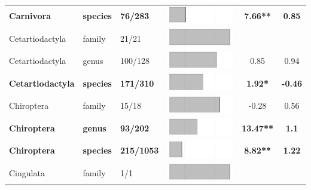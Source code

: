 \begin{longtable}{lL{1.8cm}C{2cm}lcc}
  \textbf{Carnivora} & \textbf{species} & \textbf{76/283} & \includegraphics[width=0.20\linewidth, height=0.05\linewidth]{Table_figures/bar6.pdf} & \textbf{7.66**} & \textbf{0.85} \\ 
  Cetartiodactyla & family & 21/21 & \includegraphics[width=0.20\linewidth, height=0.05\linewidth]{Table_figures/bar7.pdf} &   &   \\ 
  Cetartiodactyla & genus & 100/128 & \includegraphics[width=0.20\linewidth, height=0.05\linewidth]{Table_figures/bar8.pdf} & 0.85 & 0.94 \\ 
  \textbf{Cetartiodactyla} & \textbf{species} & \textbf{171/310} & \includegraphics[width=0.20\linewidth, height=0.05\linewidth]{Table_figures/bar9.pdf} & \textbf{1.92*} & \textbf{-0.46} \\ 
  Chiroptera & family & 15/18 & \includegraphics[width=0.20\linewidth, height=0.05\linewidth]{Table_figures/bar10.pdf} & -0.28 & 0.56 \\ 
  \textbf{Chiroptera} & \textbf{genus} & \textbf{93/202} & \includegraphics[width=0.20\linewidth, height=0.05\linewidth]{Table_figures/bar11.pdf} & \textbf{13.47**} & \textbf{1.1} \\ 
  \textbf{Chiroptera} & \textbf{species} & \textbf{215/1053} & \includegraphics[width=0.20\linewidth, height=0.05\linewidth]{Table_figures/bar12.pdf} & \textbf{8.82**} & \textbf{1.22} \\ 
  Cingulata & family & 1/1 & \includegraphics[width=0.20\linewidth, height=0.05\linewidth]{Table_figures/bar13.pdf} &   &   \\ 

\end{longtable}
